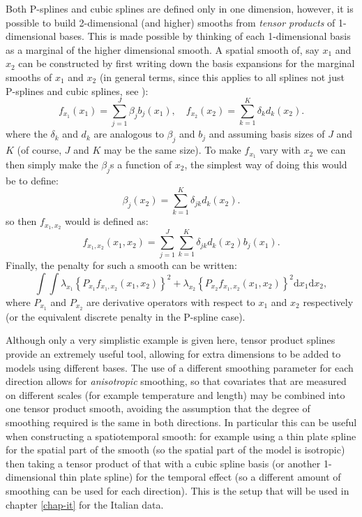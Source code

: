 Both P-splines and cubic splines are defined only in one dimension, however, it is possible to build 2-dimensional (and higher) smooths from \textit{tensor products} of 1-dimensional bases. This is made possible by thinking of each 1-dimensional basis as a marginal of the higher dimensional smooth. A spatial smooth of, say $x_1$ and $x_2$ can be constructed by first writing down the basis expansions for the marginal smooths of $x_1$ and $x_2$ (in general terms, since this applies to all splines not just P-splines and cubic splines, see ):
\begin{equation}
f_{x_1}(x_1) = \sum_{j=1}^J \beta_j b_j(x_{1}), \quad  f_{x_2}(x_2) = \sum_{k=1}^K \delta_k d_k(x_{2}).
\label{intro-tensor-def}
\end{equation}
where the $\delta_k$ and $d_k$ are analogous to $\beta_j$ and $b_j$ and assuming basis sizes of $J$ and $K$ (of course, $J$ and $K$ may be the same size). To make $f_{x_1}$ vary with $x_2$ we can then simply make the $\beta_j$s a function of $x_2$, the simplest way of doing this would be to define:
\begin{equation*}
\beta_j(x_2) = \sum_{k=1}^K \delta_{jk} d_k(x_{2}).
\end{equation*}
so then $f_{x_1,x_2}$ would is defined as:
\begin{equation*}
f_{x_1, x_2}(x_1,x_2) = \sum_{j=1}^J \sum_{k=1}^K \delta_{jk} d_k(x_{2}) b_j(x_{1}).
\end{equation*}
Finally, the penalty for such a smooth can be written:
\begin{equation*}
\int\int \lambda_{x_1} \left \{P_{x_1} f_{x_1, x_2}(x_1,x_2)\right \}^2 + \lambda_{x_2} \left \{P_{x_2} f_{x_1, x_2}(x_1,x_2)\right \}^2 \text{d}x_1\text{d}x_2,
\end{equation*}
where $P_{x_1}$ and $P_{x_2}$ are derivative operators with respect to $x_1$ and $x_2$ respectively (or the equivalent discrete penalty in the P-spline case).

Although only a very simplistic example is given here, tensor product splines provide an extremely useful tool, allowing for extra dimensions to be added to models using different bases. The use of a different smoothing parameter for each direction allows for \textit{anisotropic} smoothing, so that covariates that are measured on different scales (for example temperature and length) may be combined into one tensor product smooth, avoiding the assumption that the degree of smoothing required is the same in both directions. In particular this can be useful when constructing a spatiotemporal smooth: for example using a thin plate spline for the spatial part of the smooth (so the spatial part of the model is isotropic) then taking a tensor product of that with a cubic spline basis (or another 1-dimensional thin plate spline) for the temporal effect (so a different amount of smoothing can be used for each direction). This is the setup that will be used in chapter \ref{chap-it} for the Italian data.

